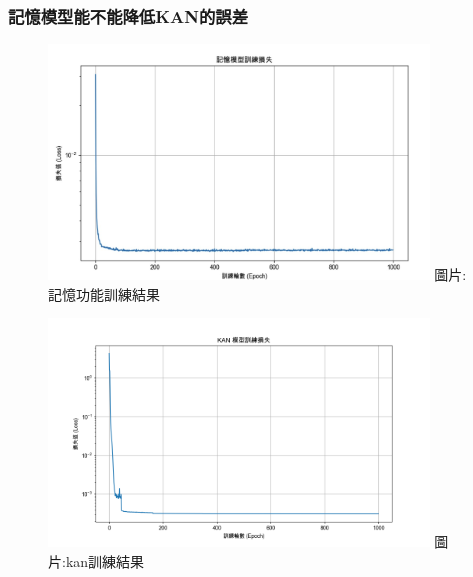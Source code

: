 \documentclass{beamer}
\begin{document}
\begin{frame}
    \frametitle{記憶模型能不能降低KAN的誤差}
    \begin{figure}
        \centering
        \begin{minipage}{\textwidth}
            \includegraphics[width=0.9\textwidth,height=0.4\textheight,keepaspectratio]{figures/記憶功能.jpg}
            \centering
            圖片:記憶功能訓練結果
        \end{minipage}
        
        \vspace{0.5em}
        
        \begin{minipage}{\textwidth}
            \includegraphics[width=0.9\textwidth,height=0.4\textheight,keepaspectratio]{figures/kan_training_loss.png}
            \centering
            圖片:kan訓練結果
        \end{minipage}
    \end{figure}
\end{frame}
\end{document}
